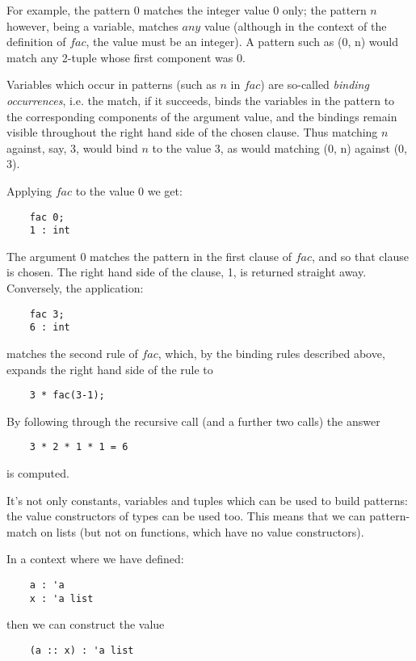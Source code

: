 For example, the pattern 0 matches the integer value 0 only; the pattern
$n$ however, being a variable, matches $any$ value (although in the
context of the definition of $fac$, the value must be an integer). A
pattern such as (0, n) would match any 2-tuple whose first component was
0.

Variables which occur in patterns (such as $n$ in $fac$) are so-called
{\em binding occurrences}, i.e. the match, if it succeeds, binds the
variables in the pattern to the corresponding components of the argument
value, and the bindings remain visible throughout the right hand side of
the chosen clause. Thus matching $n$ against, say, 3, would bind $n$ to
the value 3, as would matching (0, n) against (0, 3).

Applying $fac$ to the value 0 we get:
\begin{verbatim}
    fac 0;
    1 : int
\end{verbatim}

The argument 0 matches the pattern in the first clause of $fac$, and so
that clause is chosen. The right hand side of the clause, 1, is returned
straight away. Conversely, the application:
\begin{verbatim}
    fac 3;
    6 : int
\end{verbatim} 

matches the second rule of $fac$, which, by the binding rules described
above, expands the right hand side of the rule to
\begin{verbatim}
    3 * fac(3-1);
\end{verbatim}

By following through the recursive call (and a further two calls) the
answer
\begin{verbatim}
    3 * 2 * 1 * 1 = 6
\end{verbatim}

is computed.

It's not only constants, variables and tuples which can be used to build
patterns: the value constructors of types can be used too. This means
that we can pattern-match on lists (but not on functions, which have no
value constructors).

In a context where we have defined:
\begin{verbatim}
    a : 'a
    x : 'a list
\end{verbatim}

then we can construct the value
\begin{verbatim}
    (a :: x) : 'a list
\end{verbatim}

